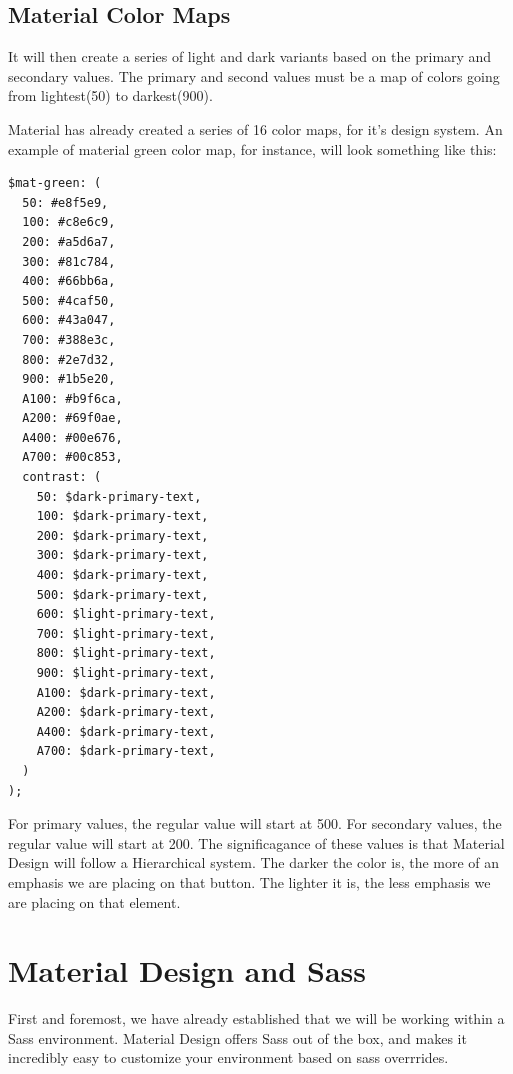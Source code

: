 \subsection{Material Color Maps}

It will then create a series of light and dark variants based on the primary 
and secondary values. The primary and second values must be a map of colors 
going from lightest(50) to darkest(900). 

Material has already created a series of 16 color maps, for it's design system. 
An example of material green color map, for instance, will look something like 
this: 
\begin{lstlisting}
$mat-green: (
  50: #e8f5e9,
  100: #c8e6c9,
  200: #a5d6a7,
  300: #81c784,
  400: #66bb6a,
  500: #4caf50,
  600: #43a047,
  700: #388e3c,
  800: #2e7d32,
  900: #1b5e20,
  A100: #b9f6ca,
  A200: #69f0ae,
  A400: #00e676,
  A700: #00c853,
  contrast: (
    50: $dark-primary-text,
    100: $dark-primary-text,
    200: $dark-primary-text,
    300: $dark-primary-text,
    400: $dark-primary-text,
    500: $dark-primary-text,
    600: $light-primary-text,
    700: $light-primary-text,
    800: $light-primary-text,
    900: $light-primary-text,
    A100: $dark-primary-text,
    A200: $dark-primary-text,
    A400: $dark-primary-text,
    A700: $dark-primary-text,
  )
);
\end{lstlisting}

For primary values, the regular value will start at 500. For secondary values, 
the regular value will start at 200. The significagance of these values is that 
Material Design will follow a Hierarchical system. The darker the color is, the 
more of an emphasis we are placing on that button. The lighter it is, the less 
emphasis we are placing on that element. 


\section{Material Design and Sass}
First and foremost, we have already established that we will be working within
a Sass environment. Material Design offers Sass out of the box, and makes it 
incredibly easy to customize your environment based on sass overrrides. 

